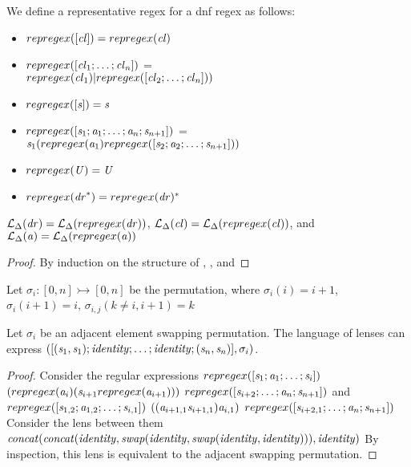 \begin{definition}[repregex]
We define a representative regex for a dnf regex as follows:
\begin{itemize}
\item $repregex([\mathit{cl}])=repregex(\mathit{cl})$
\item $repregex([\mathit{cl}_1 ; \ldots ; \mathit{cl}_n])$ =\\ $repregex(\mathit{cl}_1)| repregex([\mathit{cl}_2 ; \ldots ; \mathit{cl}_n]))$
\item $regregex([\mathit{s}]) = \mathit{s}$
\item $repregex([\mathit{s}_1 ; \mathit{a}_1 ; \ldots ; \mathit{a}_n ; \mathit{s}_{n+1}])$ =\\ $\mathit{s}_1 (repregex(\mathit{a}_1) repregex([\mathit{s}_2 ; \mathit{a}_2 ; \ldots ; \mathit{s}_{n+1}]))$
\item $repregex(\mathit{U}) = \mathit{U}$
\item $repregex(\mathit{dr}^*) = repregex(\mathit{dr})^*$
\end{itemize}
\end{definition}

\begin{lemma}
\label{lem:repregex-equiv}
$\mathcal{L}_{\Delta}(\mathit{dr})=\mathcal{L}_{\Delta}(repregex(\mathit{dr}))$,
$\mathcal{L}_{\Delta}(\mathit{cl}) = \mathcal{L}_{\Delta}(repregex(\mathit{cl}))$,
and $\mathcal{L}_{\Delta}(\mathit{a}) = \mathcal{L}_{\Delta}(repregex(\mathit{a}))$
\begin{proof}
By induction on the structure of \DNFRegex{}, \Clause{}, and \Atom{}
\end{proof}
\end{lemma}

\begin{definition}
Let $\sigma_{i} : [0,n] \rightarrowtail [0,n]$ be the permutation, where
$\sigma_{i}(i) = i+1$, $\sigma_{i}(i+1) = i$, $\sigma_{i,j}(k\neq i,i+1) = k$
\end{definition}

\begin{lemma}
Let $\sigma_{i}$ be an adjacent element swapping permutation.  The language of
lenses can express $([(\mathit{s}_1,\mathit{s}_1) ; \mathit{identity} ; \ldots ; \mathit{identity} ; (\mathit{s}_n,\mathit{s}_n)], \sigma_{i})$.
\begin{proof}
Consider the regular expressions $repregex([\mathit{s}_1;\mathit{a}_1; \ldots;\mathit{s}_i])$ $(repregex(\mathit{a}_i) (\mathit{s}_{i+1} repregex(\mathit{a}_{i+1})))$ $repregex([\mathit{s}_{i+2} ; \ldots ; \mathit{a}_{n} ; \mathit{s}_{n+1}])$ and 
$repregex([\mathit{s}_{1,2};\mathit{a}_{1,2}; \ldots;\mathit{s}_{i,1}])$ $((\mathit{a}_{i+1,1} \mathit{s}_{i+1,1})\mathit{a}_{i,1})$ $repregex([\mathit{s}_{i+2,1} ; \ldots ; \mathit{a}_{n} ; \mathit{s}_{n+1}])$
Consider the lens between them\\ $\mathit{concat}(\mathit{concat}(\mathit{identity},\mathit{swap}(\mathit{identity},\mathit{swap}(\mathit{identity},\mathit{identity}))),\mathit{identity})$
By inspection, this lens is equivalent to the adjacent swapping permutation.
\end{proof}
\end{lemma}

